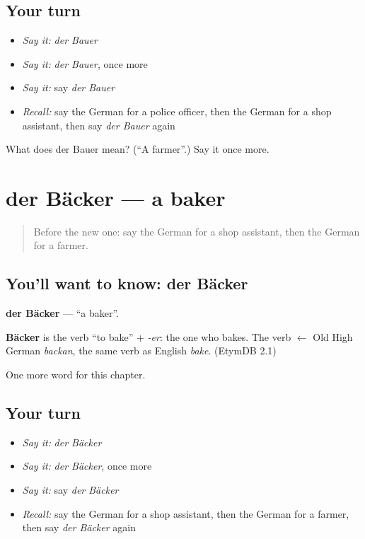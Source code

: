 \subsection*{Your turn}
\begin{itemize}
\raggedright
  \item \emph{Say it:} \emph{der Bauer}
  \item \emph{Say it:} \emph{der Bauer}, once more
  \item \emph{Say it:} say \emph{der Bauer}
  \item \emph{Recall:} say the German for a police officer, then the German for a shop assistant, then say \emph{der Bauer} again
\end{itemize}

\begin{tcolorbox}[breakable,colback=teal!4,colframe=teal!35!black,title={Before you move on}]
What does der Bauer mean? (\textquotedblleft{}A farmer\textquotedblright{}.) Say it once more.
\end{tcolorbox}
\section[der Bäcker]{der Bäcker — a baker}

\label{lesson:GE-C125-baecker}



\begin{quote}
Before the new one: say the German for a shop assistant, then the German for a farmer.
\end{quote}

\subsection*{You'll want to know: der Bäcker}
\textbf{der Bäcker} — \textquotedblleft{}a baker\textquotedblright{}.

\begin{cousinweb}
\textbf{Bäcker} is the verb \textquotedblleft{}to bake\textquotedblright{} + \emph{-er}: the one who bakes. The verb $\leftarrow$ Old High German \emph{backan}, the same verb as English \emph{bake}. (EtymDB 2.1)
\end{cousinweb}

\begin{grammarlens}[title={What you've built}]
One more word for this chapter.
\end{grammarlens}

\subsection*{Your turn}
\begin{itemize}
\raggedright
  \item \emph{Say it:} \emph{der Bäcker}
  \item \emph{Say it:} \emph{der Bäcker}, once more
  \item \emph{Say it:} say \emph{der Bäcker}
  \item \emph{Recall:} say the German for a shop assistant, then the German for a farmer, then say \emph{der Bäcker} again
\end{itemize}

